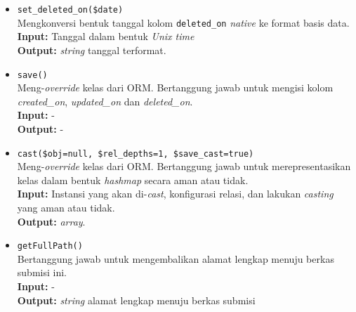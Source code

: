 \begin{itemize}
\begin{itemize}
                \item \texttt{set\_deleted\_on(\$date)} \\
                    Mengkonversi bentuk tanggal kolom \texttt{deleted\_on} \textit{native} ke 
                    format basis data. \\
                    \textbf{Input:} Tanggal dalam bentuk \textit{Unix time}\\
                    \textbf{Output:} \textit{string} tanggal terformat.
                    
                \item \texttt{save()}\\
                    Meng-\textit{override} kelas dari ORM. Bertanggung jawab untuk mengisi
                    kolom \textit{created\_on}, \textit{updated\_on} dan \textit{deleted\_on}.\\
                    \textbf{Input:} -\\
                    \textbf{Output:} -
                
                \item \texttt{cast(\$obj=null, \$rel\_depths=1, \$save\_cast=true)}\\
                    Meng-\textit{override} kelas dari ORM. Bertanggung jawab untuk merepresentasikan
                    kelas dalam bentuk \textit{hashmap} secara aman atau tidak. \\
                    \textbf{Input:} Instansi yang akan di-\textit{cast}, konfigurasi relasi, dan
                        lakukan \textit{casting} yang aman atau tidak.\\
                    \textbf{Output:} \textit{array}.
                
                \item \texttt{getFullPath()} \\
                    Bertanggung jawab untuk mengembalikan alamat lengkap menuju berkas submisi ini. \\
                    \textbf{Input:} -\\
                    \textbf{Output:} \textit{string} alamat lengkap menuju berkas submisi
            \end{itemize}
            

\end{itemize}
